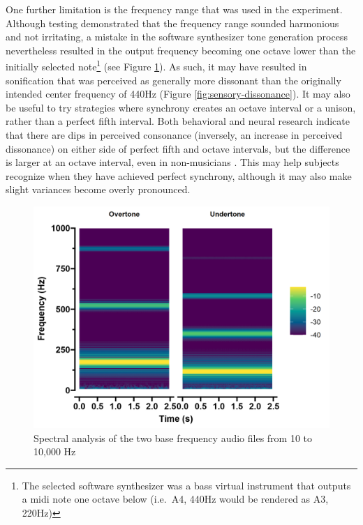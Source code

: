 \documentclass[10pt,a4paper,onecolumn]{article}
\begin{document}
One further limitation is the frequency range that was used in the experiment. Although testing demonstrated that the frequency range sounded harmonious and not irritating, a mistake in the software synthesizer tone generation process nevertheless resulted in the output frequency becoming one octave lower than the initially selected note\footnote{The selected software synthesizer was a bass virtual instrument that outputs a midi note one octave below (i.e.~A4, 440Hz would be rendered as A3, 220Hz)} (see Figure \ref{fig:stimuli-spectra}). As such, it may have resulted in sonification that was perceived as generally more dissonant than the originally intended center frequency of 440Hz (Figure \ref{fig:sensory-dissonance}). It may also be useful to try strategies where synchrony creates an octave interval or a unison, rather than a perfect fifth interval. Both behavioral and neural research indicate that there are dips in perceived consonance (inversely, an increase in perceived dissonance) on either side of perfect fifth and octave intervals, but the difference is larger at an octave interval, even in non-musicians \autocite{setharesLocalConsonanceRelationship1993,bidelmanNeuralCorrelatesConsonance2009}. This may help subjects recognize when they have achieved perfect synchrony, although it may also make slight variances become overly pronounced.

\begin{figure}[h]

{\centering \includegraphics[width=1\linewidth]{figures/spec_tones} 

}

\caption{Spectral analysis of the two base frequency audio files from 10 to 10,000 Hz}\label{fig:stimuli-spectra}
\end{figure}
\end{document}
